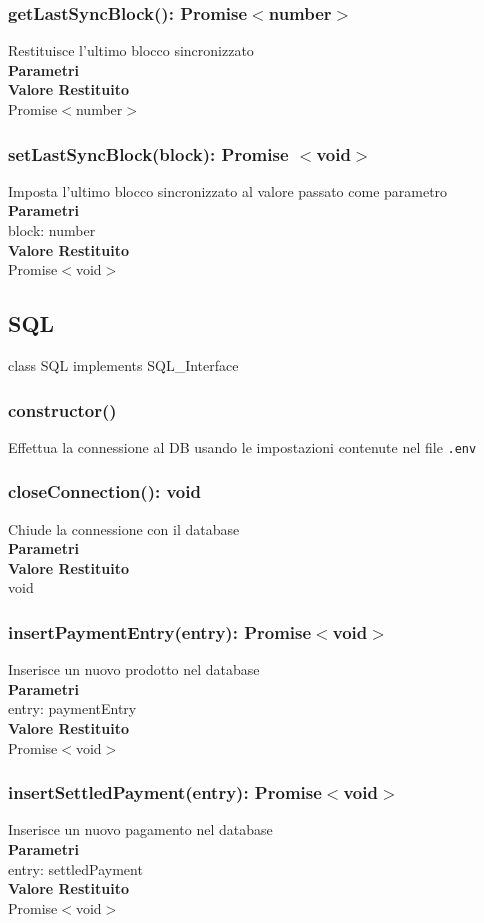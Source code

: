 \documentclass[a4paper, 12pt]{article}
\begin{document}
\subsubsection{getLastSyncBlock(): Promise$<$number$>$}
Restituisce l'ultimo blocco sincronizzato\\
\textbf{Parametri}\\
\textbf{Valore Restituito}\\
Promise$<$number$>$
\subsubsection{setLastSyncBlock(block): Promise $<$void$>$}
Imposta l'ultimo blocco sincronizzato al valore passato come parametro\\
\textbf{Parametri}\\
block: number\\
\textbf{Valore Restituito}\\
Promise$<$void$>$

\subsection{SQL}
class SQL implements SQL\_Interface
\subsubsection{constructor()}
Effettua la connessione al DB usando le impostazioni contenute nel file \texttt{.env}\\
\subsubsection{closeConnection(): void}
Chiude la connessione con il database\\
\textbf{Parametri}\\
\textbf{Valore Restituito}\\
void
\subsubsection{insertPaymentEntry(entry): Promise$<$void$>$}
Inserisce un nuovo prodotto nel database\\
\textbf{Parametri}\\
entry: paymentEntry\\
\textbf{Valore Restituito}\\
Promise$<$void$>$
\subsubsection{insertSettledPayment(entry): Promise$<$void$>$}
Inserisce un nuovo pagamento nel database\\
\textbf{Parametri}\\
entry: settledPayment\\
\textbf{Valore Restituito}\\
Promise$<$void$>$
\end{document}
